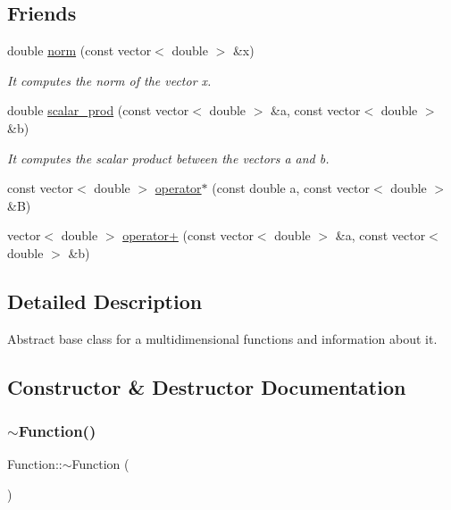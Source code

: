 \subsection*{Friends}
\begin{DoxyCompactItemize}
\item 
double \hyperlink{class_function_a52e0aa61f3f38c1b981ad4c1deeebed5}{norm} (const vector$<$ double $>$ \&x)
\begin{DoxyCompactList}\small\item\em It computes the norm of the vector x. \end{DoxyCompactList}\item 
double \hyperlink{class_function_a5bba89b945d56abb9cf2dd756cf71fb8}{scalar\+\_\+prod} (const vector$<$ double $>$ \&a, const vector$<$ double $>$ \&b)
\begin{DoxyCompactList}\small\item\em It computes the scalar product between the vectors a and b. \end{DoxyCompactList}\item 
const vector$<$ double $>$ \hyperlink{class_function_a5c042028e918038808f0b9255d846bdc}{operator$\ast$} (const double a, const vector$<$ double $>$ \&B)
\item 
vector$<$ double $>$ \hyperlink{class_function_af7fb1be44ca3ade61cec8d396d0a3ca1}{operator+} (const vector$<$ double $>$ \&a, const vector$<$ double $>$ \&b)
\end{DoxyCompactItemize}


\subsection{Detailed Description}
Abstract base class for a multidimensional functions and information about it. 

\subsection{Constructor \& Destructor Documentation}
\mbox{\label{class_function_a3b03f7cf0b75d16edebdda1dee1db6fd}} 
\subsubsection{\texorpdfstring{$\sim$\+Function()}{~Function()}}
{\footnotesize\ttfamily Function\+::$\sim$\+Function (\begin{DoxyParamCaption}{ }\end{DoxyParamCaption})}



